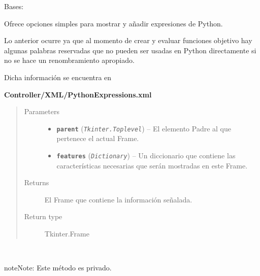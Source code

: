 \documentclass[letterpaper,10pt,english]{sphinxmanual}
\begin{document}
\begin{fulllineitems}
\label{View/Additional/MenuInternalOption/InternalOptionTab/ExpressionFrame:View.Additional.MenuInternalOption.InternalOptionTab.ExpressionFrame.ExpressionFrame}
Bases: 

\begin{DUlineblock}{0em}
\item[] Ofrece opciones simples para mostrar y añadir expresiones
de Python. 
\item[] Lo anterior ocurre ya que al momento de crear y evaluar funciones objetivo 
hay algunas palabras reservadas que no pueden ser usadas en Python 
directamente si no se hace un renombramiento apropiado.
\item[] Dicha información se encuentra en 
\item[] \textbf{Controller/XML/PythonExpressions.xml}
\end{DUlineblock}
\begin{quote}\begin{description}
\item[{Parameters}] \leavevmode\begin{itemize}
\item {} 
\textbf{\texttt{parent}} (\emph{\texttt{Tkinter.Toplevel}}) -- El elemento Padre al que pertenece el actual
Frame.

\item {} 
\textbf{\texttt{features}} (\emph{\texttt{Dictionary}}) -- Un diccionario que contiene las características necesarias
que serán mostradas en este Frame.

\end{itemize}

\item[{Returns}] \leavevmode
El Frame que contiene la información señalada.

\item[{Return type}] \leavevmode
Tkinter.Frame

\end{description}\end{quote}

\begin{fulllineitems}
\label{View/Additional/MenuInternalOption/InternalOptionTab/ExpressionFrame:View.Additional.MenuInternalOption.InternalOptionTab.ExpressionFrame.ExpressionFrame._ExpressionFrame__add_expression}~
\begin{notice}{note}{Note:}
Este método es privado.
\end{notice}


\end{fulllineitems}
\end{fulllineitems}
\end{document}
